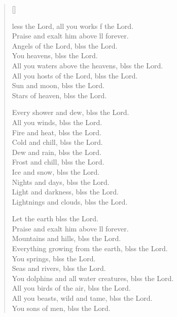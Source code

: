 \settowidth{\versewidth}{Let us bless the Father, and the Son, and the Holy Spirit. *}
\begin{verse}[\versewidth]
  \begin{patverse}
    less the Lord, all you works f the Lord.\Med\\
Praise and exalt him above ll forever.\\
Angels of the Lord, blss the Lord.\Med\\
You heavens, blss the Lord.\\
All you waters above the heavens, blss the Lord.\Med\\
All you hosts of the Lord, blss the Lord.\\
Sun and moon, blss the Lord.\Med\\
Stars of heaven, blss the Lord.

Every shower and dew, blss the Lord.\Med\\
All you winds, blss the Lord.\\
Fire and heat, blss the Lord.\Med\\
Cold and chill, blss the Lord.\\
Dew and rain, blss the Lord.\Med\\
Frost and chill, blss the Lord.\\
Ice and snow, blss the Lord.\Med\\
Nights and days, blss the Lord.\\
Light and darkness, blss the Lord.\Med\\
Lightnings and clouds, blss the Lord.

Let the earth blss the Lord.\Med\\
Praise and exalt him above ll forever.\\
Mountains and hills, blss the Lord.\Med\\
Everything growing from the earth, blss the Lord.\\
You springs, blss the Lord.\Med\\
Seas and rivers, blss the Lord.\\
You dolphins and all water creatures, blss the Lord.\Med\\
All you birds of the air, blss the Lord.\\
All you beasts, wild and tame, blss the Lord.\Med\\
You sons of men, blss the Lord.


\end{patverse}
\end{verse}
